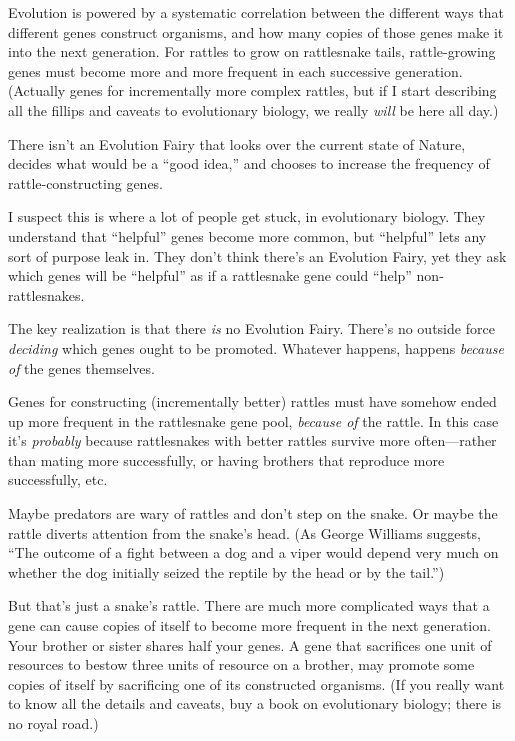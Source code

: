  Evolution is powered by a systematic correlation between the
different ways that different genes construct organisms, and how many
copies of those genes make it into the next generation. For rattles to
grow on rattlesnake tails, rattle-growing genes must become more and
more frequent in each successive generation. (Actually genes for
incrementally more complex rattles, but if I start describing all the
fillips and caveats to evolutionary biology, we really \textit{will} be
here all day.)


 There isn't an Evolution Fairy that looks over the
current state of Nature, decides what would be a
``good idea,'' and chooses to
increase the frequency of rattle-constructing genes.


 I suspect this is where a lot of people get stuck, in evolutionary
biology. They understand that
``helpful'' genes become more
common, but ``helpful'' lets any
sort of purpose leak in. They don't think
there's an Evolution Fairy, yet they ask which genes
will be ``helpful'' as if a
rattlesnake gene could ``help''
non-rattlesnakes.


 The key realization is that there \textit{is} no Evolution Fairy.
There's no outside force \textit{deciding} which genes
ought to be promoted. Whatever happens, happens \textit{because of} the
genes themselves.


 Genes for constructing (incrementally better) rattles must have
somehow ended up more frequent in the rattlesnake gene pool,
\textit{because of} the rattle. In this case it's
\textit{probably} because rattlesnakes with better rattles survive more
often---rather than mating more successfully, or having brothers that
reproduce more successfully, etc.


 Maybe predators are wary of rattles and don't step
on the snake. Or maybe the rattle diverts attention from the
snake's head. (As George Williams suggests,
``The outcome of a fight between a dog and a viper
would depend very much on whether the dog initially seized the reptile
by the head or by the tail.'')


 But that's just a snake's rattle.
There are much more complicated ways that a gene can cause copies of
itself to become more frequent in the next generation. Your brother or
sister shares half your genes. A gene that sacrifices one unit of
resources to bestow three units of resource on a brother, may promote
some copies of itself by sacrificing one of its constructed organisms.
(If you really want to know all the details and caveats, buy a book on
evolutionary biology; there is no royal road.)


